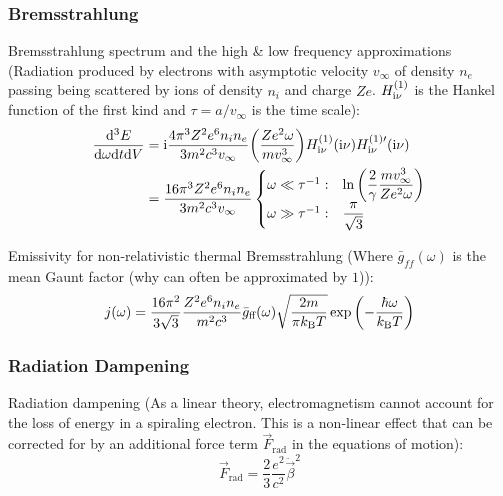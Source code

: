 		\subsubsection{Bremsstrahlung}
			\noindent
			Bremsstrahlung spectrum and the high \& low frequency approximations (Radiation produced by electrons with asymptotic velocity $v_\infty$ of density $n_e$ passing being scattered by ions of density $n_i$ and charge $Ze$. $H_{\mathrm{i} \nu}^{(1)}$ is the Hankel function of the first kind and $\tau=a / v_\infty$ is the time scale):
			\begin{equation}
				\begin{aligned}
					\frac{\dd^3 E}{\dd \omega \dd t \dd V} &= \mathrm{i} \frac{4\pi^3 Z^2 e^6 n_i n_e}{3m^2 c^3 v_\infty}\qty(\frac{Z e^2 \omega}{m v_\infty^3}) H_{\mathrm{i} \nu}^{(1)}(\mathrm{i}\nu) H_{\mathrm{i} \nu}^{(1)\prime}(\mathrm{i}\nu) \\
					&= \frac{16\pi^3 Z^2 e^6 n_i n_e}{3m^2 c^3 v_\infty}
					\begin{cases}
						\omega \ll \tau^{-1}: & \ln\qty(\dfrac{2}{\gamma}\dfrac{m v_{\infty}^3}{Z e^2 \omega}) \\
						\omega \gg \tau^{-1}: & \dfrac{\pi}{\sqrt{3}} \\
					\end{cases}\\
				\end{aligned}
			\end{equation}

			\noindent
			Emissivity for non-relativistic thermal Bremsstrahlung (Where $\bar{g}_{ff}(\omega)$ is the mean Gaunt factor (why can often be approximated by $1$)):
			\begin{equation}
				j(\omega) = \frac{16\pi^2}{3\sqrt{3}} \frac{Z^2 e^6 n_i n_e}{m^2 c^3} \bar{g}_{\text{ff}}(\omega) \sqrt{\frac{2m}{\pi k_{\text{B}} T}} \exp\qty(-\frac{\hbar \omega}{k_{\text{B}} T})
			\end{equation}

		\subsubsection{Radiation Dampening}
			Radiation dampening (As a linear theory, electromagnetism cannot account for the loss of energy in a spiraling electron. This is a non-linear effect that can be corrected for by an additional force term $\vec{F}_\text{rad}$ in the equations of motion):
			\begin{equation}
				\vec{F}_\text{rad} = \frac{2}{3} \frac{e^2}{c^2} \ddot{\vec{\beta}}^2
			\end{equation}

